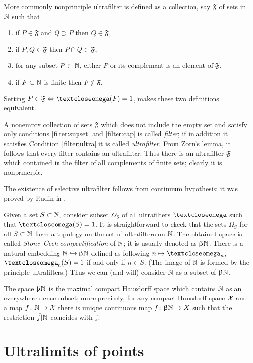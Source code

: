 More commonly nonprinciple ultrafilter is defined as a collection, say $\mathfrak{F}$ of sets in $\mathbb{N}$ such that
\begin{enumerate}
\item\label{filter:supset} if $P\in \mathfrak{F}$ and $Q\supset P$ then $Q\in \mathfrak{F}$,
\item\label{filter:cap} if $P, Q\in \mathfrak{F}$ then $P\cap Q\in \mathfrak{F}$,
\item\label{filter:ultra} for any subset $P\subset\NN$, either $P$ or its complement is an element of $\mathfrak{F}$.
\item\label{filter:non-prin} if $F\subset \NN $ is finite then $F\notin \mathfrak{F}$.
\end{enumerate}
Setting $P\in\mathfrak{F}\Leftrightarrow\o(P)=1$, makes these two definitions equivalent.

A nonempty collection of sets $\mathfrak{F}$ which does not include the empty set and satisfy only conditions \ref{filter:supset} and \ref{filter:cap} is called \emph{filter}; 
if in addition it satisfies Condition~\ref{filter:ultra} it is called \emph{ultrafilter}.
From Zorn's lemma, it follows that every filter contains an ultrafilter.
Thus there is an ultrafilter $\mathfrak{F}$ which contained in the filter of all complements of finite sets; clearly it is nonprinciple.

The existence of selective ultrafilter follows from continuum hypothesis;
it was proved by  Rudin in \cite{rudin}.

Given a set $S\subset \NN$, consider subset $\Omega_S$ of all ultrafilters $\o$ such that $\o(S)=1$.
It is straightforward to check that the sets $\Omega_S$ for all $S\subset \NN$ form a topology on the set of ultrafilters on $\mathbb{N}$. 
The obtained space is called \emph{Stone--\v{C}ech compactification} of $\mathbb{N}$;
it is usually denoted as $\upbeta\mathbb{N}$.
There is a natural embedding $\NN\hookrightarrow\beta\NN$ defined as following
$n\mapsto\o_n$, $\o_n(S)=1$ if and only if $n\in S$. 
(The image of $\mathbb{N}$ is formed by the principle ultrafilters.)
Thus we can (and will) consider $\mathbb{N}$ as a subset of $\upbeta\mathbb{N}$.

The space $\upbeta\mathbb{N}$ is the maximal compact Hausdorff space which contains $\mathbb{N}$  as an everywhere dense subset;
more precisely, for any compact Hausdorff space $\mathcal{X}$ 
and a map $f\:\NN\to \spc{X}$ there is unique continuous map $\bar f\:\beta\NN\to X$ such that the restriction $\bar f|\mathbb{N}$ coincides with $f$. 

\section{Ultralimits of points}
\label{ultralimits}

